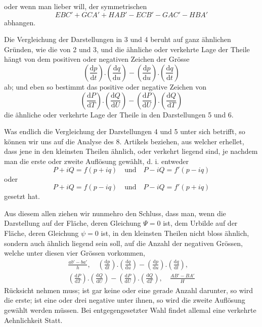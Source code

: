 %
\noindent oder wenn man lieber will, der symmetrischen
\[
EBC'+GCA'+HAB'-ECB'-GAC'-HBA'
\]
\noindent abhangen.

Die Vergleichung der Darstellungen in 3 und 4 beruht auf ganz ähnlichen Gründen, wie die von 2 und 3, und die ähnliche oder verkehrte Lage der Theile hängt von dem positiven oder negativen Zeichen der Grösse
\[
(\frac{\mathrm{d}p}{\mathrm{d}t})\mathord{.}(\frac{\mathrm{d}q}{\mathrm{d}u})-(\frac{\mathrm{d}p}{\mathrm{d}u})\mathord{.}(\frac{\mathrm{d}q}{\mathrm{d}t})
\]
\noindent ab; und eben so bestimmt das positive oder negative Zeichen von
\[
(\frac{\mathrm{d}P}{\mathrm{d}T})\mathord{.}(\frac{\mathrm{d}Q}{\mathrm{d}U})-(\frac{\mathrm{d}P}{\mathrm{d}U})\mathord{.}(\frac{\mathrm{d}Q}{\mathrm{d}T})
\]
\noindent die ähnliche oder verkehrte Lage der Theile in den Darstellungen 5 und 6.

Was endlich die Vergleichung der Darstellungen 4 und 5 unter sich betrifft, so können wir uns auf die Analyse des 8. Artikels beziehen, aus welcher erhellet, dass jene in den kleinsten Theilen ähnlich, oder verkehrt liegend sind, je nachdem man die erste oder zweite Auflösung gewählt, d. i. entweder
\[
P+iQ=f(p+iq)\quad\text{und}\quad P-iQ=f'(p-iq)
\]
\noindent oder
\[
P+iQ=f(p-iq)\quad\text{und}\quad P-iQ=f'(p+iq)
\]
\noindent gesetzt hat.

Aus diesem allen ziehen wir nunmehro den Schluss, dass man, wenn die Darstellung auf der Fläche, deren Gleichung \(\Psi=0\) ist, dem Urbilde auf der Fläche, deren Gleichung \(\psi=0\) ist, in den kleinsten Theilen nicht bloss ähnlich, sondern auch ähnlich liegend sein soll, auf die Anzahl der negativen Grössen, welche unter diesen vier Grössen vorkommen,
\[
\begin{gathered}
\frac{ab'-ba'}{h},\quad (\frac{\mathrm{d}p}{\mathrm{d}t})\mathord{.}(\frac{\mathrm{d}q}{\mathrm{d}u})-(\frac{\mathrm{d}p}{\mathrm{d}u})\mathord{.}(\frac{\mathrm{d}q}{\mathrm{d}t}),\\
(\frac{\mathrm{d}P}{\mathrm{d}T})\mathord{.}(\frac{\mathrm{d}Q}{\mathrm{d}U})-(\frac{\mathrm{d}P}{\mathrm{d}U})\mathord{.}(\frac{\mathrm{d}Q}{\mathrm{d}T}),\quad \frac{AB'-BA'}{H}
\end{gathered}
\]
\noindent Rücksicht nehmen muss; ist gar keine oder eine gerade Anzahl darunter, so wird die erste; ist eine oder drei negative unter ihnen, so wird die zweite Auflösung gewählt werden müssen. Bei entgegengesetzter Wahl findet allemal eine verkehrte Aehnlichkeit Statt.
